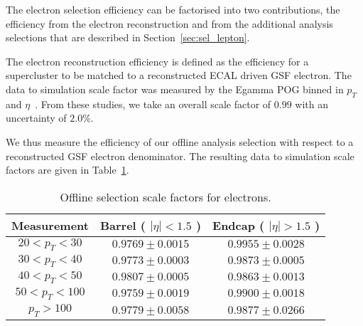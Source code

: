 
The electron selection efficiency can be factorised into two contributions,
the efficiency from the electron reconstruction and from the additional
analysis selections that are described in Section~\ref{sec:sel_lepton}.

The electron reconstruction efficiency is defined as the efficiency for a
supercluster to be matched to a reconstructed ECAL driven GSF electron.
The data to simulation scale factor was measured by the Egamma POG binned in
$p_T$ and $\eta$~\cite{ref:egamma_eff_gsf}. From these studies, we take an overall scale factor of
$0.99$ with an uncertainty of $2.0\%$.

We thus measure the efficiency of our offline analysis selection 
with respect to a reconstructed GSF electron denominator. 
The resulting data to simulation scale factors are given in Table~\ref{tab:eff_ele_offline}.


\begin{table}[!ht]
\begin{center}
\begin{tabular}{c|c|c}
\hline
Measurement & Barrel ( $|\eta|<1.5$ )   & Endcap ( $|\eta|>1.5$ )  \\ 
\hline
$20 < p_T < 30$  & $0.9769 \pm 0.0015$ & $0.9955 \pm 0.0028$  \\ \hline
$30 < p_T < 40$  & $0.9773 \pm 0.0003$ & $0.9873 \pm 0.0005$  \\ \hline
$40 < p_T < 50$  & $0.9807 \pm 0.0005$ & $0.9863 \pm 0.0013$  \\ \hline
$50 < p_T < 100$ & $0.9759 \pm 0.0019$ & $0.9900 \pm 0.0018$  \\ \hline
$p_T > 100$      & $0.9779 \pm 0.0058$ & $0.9877 \pm 0.0266$  \\ \hline 
\end{tabular}
\caption{Offline selection scale factors for electrons.}
\label{tab:eff_ele_offline}
\end{center}
\end{table}

